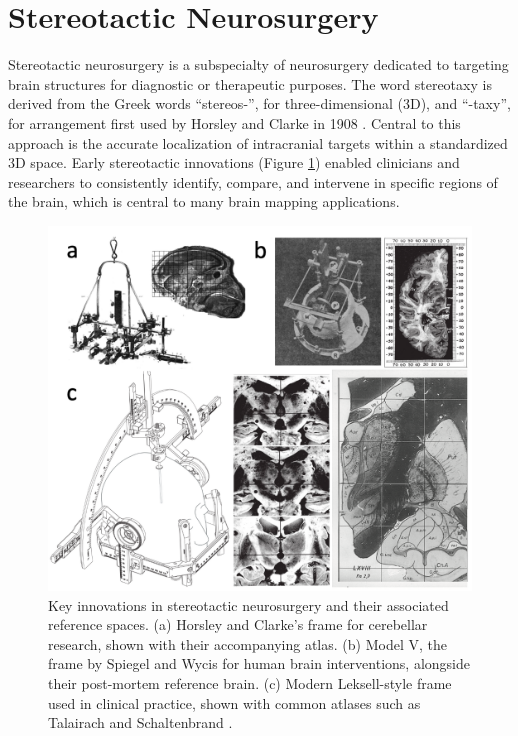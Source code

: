 \section{Stereotactic Neurosurgery}
Stereotactic neurosurgery is a subspecialty of neurosurgery dedicated to targeting brain structures for diagnostic or therapeutic purposes. The word stereotaxy is derived from the Greek words “stereos-”, for three-dimensional (3D), and “-taxy”, for arrangement first used by Horsley and Clarke in 1908 \cite{Horsley1908-om}. Central to this approach is the accurate localization of intracranial targets within a standardized 3D space. Early stereotactic innovations (Figure \ref{fig:ch1_Figure_stereoframe}) enabled clinicians and researchers to consistently identify, compare, and intervene in specific regions of the brain, which is central to many brain mapping applications.

\begin{figure}[hbt!]
    \centering
    \includegraphics[width=0.85\linewidth]{figs/ch1_Figure_stereoframe.png}
    \caption{Key innovations in stereotactic neurosurgery and their associated reference spaces. (a) Horsley and Clarke’s \cite {Horsley1908-om} frame for cerebellar research, shown with their accompanying atlas. (b) Model V, the frame by Spiegel and Wycis \cite{Spiegel1947-rq} for human brain interventions, alongside their post-mortem reference brain. (c) Modern Leksell-style frame used in clinical practice, shown with common atlases such as Talairach \cite{Talairach1957-eb} and Schaltenbrand \cite{Schaltenbrand1977-ge}.}
    \label{fig:ch1_Figure_stereoframe}
\end{figure}

